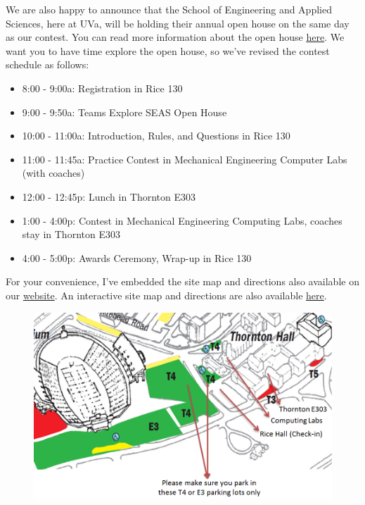 \documentclass[11pt,twoside,letterpaper]{book}
\newenvironment{itemlist}{
\begin{itemize}
\setlength{\itemsep}{0pt}
\setlength{\parskip}{0pt}}
{\end{itemize}}
\begin{document}
\noindent We are also happy to announce that the School of Engineering
and Applied Sciences, here at UVa, will be holding their annual open
house on the same day as our contest. You can read more information
about the open
house \href{http://www.seas.virginia.edu/events/openhouse.php}{here}. We
want you to have time explore the open house, so we've revised the
contest schedule as follows:



\begin{itemlist}
\item 8:00 - 9:00a:	Registration in Rice 130
\item 9:00 - 9:50a:	Teams Explore SEAS Open House
\item 10:00 - 11:00a:	Introduction, Rules, and Questions in Rice 130
\item 11:00 - 11:45a:	Practice Contest in Mechanical Engineering
Computer Labs (with coaches)
\item 12:00 - 12:45p:	Lunch in Thornton E303
\item 1:00 - 4:00p:	Contest in Mechanical Engineering Computing
Labs, coaches stay in Thornton E303
\item 4:00 - 5:00p:	Awards Ceremony, Wrap-up in Rice 130
\end{itemlist}

\noindent For your convenience, I've embedded the site map and
directions also available on our
\href{http://acm.cs.virginia.edu/?page_id=148}{website}. An
interactive site map and directions are also available
\href{http://www.bing.com/maps/?v=2&cp=qb4v7w8fqq8y&lvl=18.61&dir=357.51&sty=u&cid=45063A907E1C57C2!389&form=LMLTCC}{here}.

\begin{figure}[H]
\begin{center}
\includegraphics[width=5in]{images/HSPC-2012-Site-Map.png}
\end{center}
\end{figure}
\end{document}
